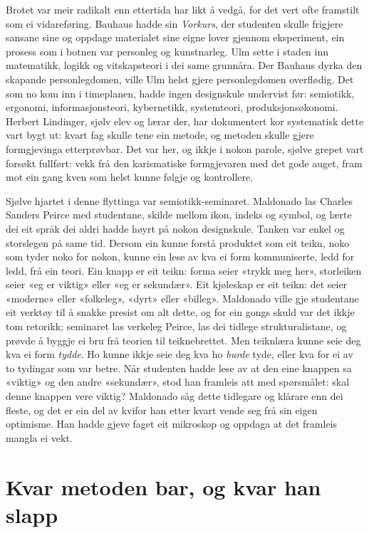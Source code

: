 Brotet var meir radikalt enn ettertida har likt å vedgå, for det vert ofte framstilt som ei vidareføring. Bauhaus hadde sin \emph{Vorkurs}, der studenten skulle frigjere sansane sine og oppdage materialet sine eigne lover gjennom eksperiment, ein prosess som i botnen var personleg og kunstnarleg. Ulm sette i staden inn matematikk, logikk og vitskapsteori i dei same grunnåra. Der Bauhaus dyrka den skapande personlegdomen, ville Ulm helst gjere personlegdomen overflødig. Det som no kom inn i timeplanen, hadde ingen designskule undervist før: semiotikk, ergonomi, informasjonsteori, kybernetikk, systemteori, produksjonsøkonomi. Herbert Lindinger, sjølv elev og lærar der, har dokumentert kor systematisk dette vart bygt ut: kvart fag skulle tene ein metode, og metoden skulle gjere formgjevinga etterprøvbar\autocite{lindinger1991ulm}. Det var her, og ikkje i nokon parole, sjølve grepet vart forsøkt fullført: vekk frå den karismatiske formgjevaren med det gode auget, fram mot ein gang kven som helst kunne følgje og kontrollere.

Sjølve hjartet i denne flyttinga var semiotikk-seminaret. Maldonado las Charles Sanders Peirce med studentane, skilde mellom ikon, indeks og symbol, og lærte dei eit språk dei aldri hadde høyrt på nokon designskule. Tanken var enkel og storslegen på same tid. Dersom ein kunne forstå produktet som eit teikn, noko som tyder noko for nokon, kunne ein lese av kva ei form kommuniserte, ledd for ledd, frå ein teori. Ein knapp er eit teikn: forma seier «trykk meg her», storleiken seier «eg er viktig» eller «eg er sekundær». Eit kjøleskap er eit teikn: det seier «moderne» eller «folkeleg», «dyrt» eller «billeg». Maldonado ville gje studentane eit verktøy til å snakke presist om alt dette, og for ein gongs skuld var det ikkje tom retorikk; seminaret las verkeleg Peirce, las dei tidlege strukturalistane, og prøvde å byggje ei bru frå teorien til teiknebrettet. Men teiknlæra kunne seie deg kva ei form \emph{tydde}. Ho kunne ikkje seie deg kva ho \emph{burde} tyde, eller kva for ei av to tydingar som var betre. Når studenten hadde lese av at den eine knappen sa «viktig» og den andre «sekundær», stod han framleis att med spørsmålet: skal denne knappen vere viktig? Maldonado såg dette tidlegare og klårare enn dei fleste, og det er ein del av kvifor han etter kvart vende seg frå sin eigen optimisme. Han hadde gjeve faget eit mikroskop og oppdaga at det framleis mangla ei vekt.

\section{Kvar metoden bar, og kvar han slapp}

